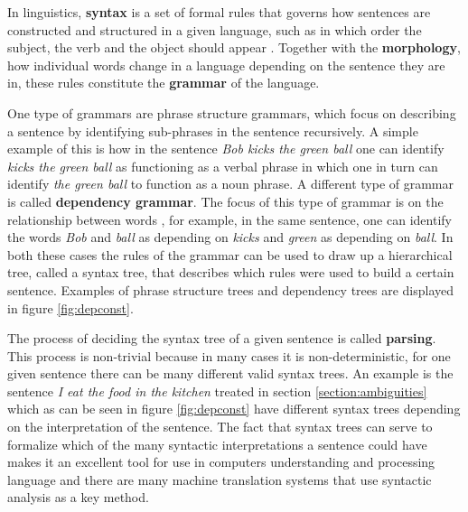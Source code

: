 In linguistics, \textbf{syntax} is a set of formal rules that governs how sentences are constructed and structured in a given language, such as in which order the subject, the verb and the object should appear \citep{chomsky2002syntactic}. Together with the \textbf{morphology}, how individual words change in a language depending on the sentence they are in, these rules constitute the \textbf{grammar} of the language. 

One type of grammars are phrase structure grammars, which focus on describing a sentence by identifying sub-phrases in the sentence recursively. A simple example of this is how in the sentence \emph{Bob kicks the green ball} one can identify \emph{kicks the green ball} as functioning as a verbal phrase in which one in turn can identify \emph{the green ball} to function as a noun phrase. A different type of grammar is called \textbf{dependency grammar}. The focus of this type of grammar is on the relationship between words \citep{nivre2005dependency}, for example, in the same sentence, one can identify the words \emph{Bob} and \emph{ball} as depending on \emph{kicks} and \emph{green} as depending on \emph{ball}. In both these cases the rules of the grammar can be used to draw up a hierarchical tree, called a syntax tree, that describes which rules were used to build a certain sentence. Examples of phrase structure trees and dependency trees are displayed in figure \ref{fig:depconst}. %

The process of deciding the syntax tree of a given sentence is called \textbf{parsing}. This process is non-trivial because in many cases it is non-deterministic, for one given sentence there can be many different valid syntax trees. An example is the sentence \emph{I eat the food in the kitchen} treated in section \ref{section:ambiguities} which as can be seen in figure \ref{fig:depconst} have different syntax trees depending on the interpretation of the sentence. The fact that syntax trees can serve to formalize which of the many syntactic interpretations a sentence could have makes it an excellent tool for use in computers understanding and processing language and there are many machine translation systems that use syntactic analysis as a key method.





